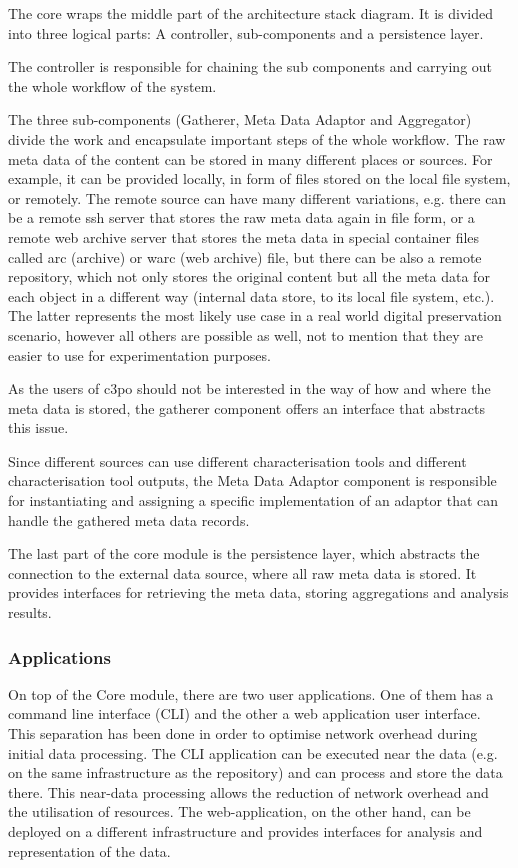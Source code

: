 The core wraps the middle part of the architecture stack diagram. It is divided into three logical parts: A controller, sub-components and a persistence layer.

The controller is responsible for chaining the sub components and carrying out the whole workflow of the system.

The three sub-components (Gatherer, Meta Data Adaptor and Aggregator) divide the work and encapsulate important steps of the whole workflow. The raw meta data of the content can be stored in many different places or sources. For example, it can be provided locally, in form of files stored on the local file system, or remotely. The remote source can have many different variations, e.g. there can be a remote ssh server that stores the raw meta data again in file form, or a remote web archive server that stores the meta data in special container files called arc (archive) or warc (web archive) file, but there can be also a remote repository, which not only stores the original content but all the meta data for each object in a different way (internal data store, to its local file system, etc.). The latter represents the most likely use case in a real world digital preservation scenario, however all others are possible as well, not to mention that they are easier to use for experimentation purposes.

As the users of c3po should not be interested in the way of how and where the meta data is stored, the gatherer component offers an interface that abstracts this issue.

Since different sources can use different characterisation tools and different characterisation tool outputs, the Meta Data Adaptor component is responsible for instantiating and assigning a specific implementation of an adaptor that can handle the gathered meta data records. 

The last part of the core module is the persistence layer, which abstracts the connection to the external data source, where all raw meta data is stored. It provides interfaces for retrieving the meta data, storing aggregations and analysis results.

\subsubsection{Applications}
On top of the Core module, there are two user applications. One of them has a command line interface (CLI) and the other a  web application user interface. This separation has been done in order to optimise network overhead during initial data processing. The CLI application can be executed near the data (e.g. on the same infrastructure as the repository) and can process and store the data there. This near-data processing allows the reduction of network overhead and the utilisation of resources. The web-application, on the other hand, can be deployed on a different infrastructure and provides interfaces for analysis and representation of the data.

